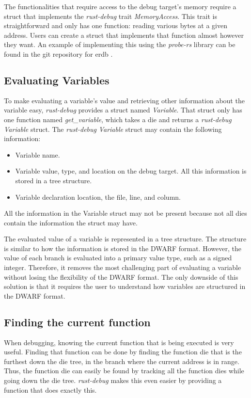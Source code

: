 The functionalities that require access to the debug target's memory require a struct that implements the \emph{rust-debug} trait \emph{MemoryAccess}.
This trait is straightforward and only has one function: reading various bytes at a given address.
Users can create a struct that implements that function almost however they want.
An example of implementing this using the \emph{probe-rs} library can be found in the git repository for \gls{erdb} \cite{erdb}.



\subsection{Evaluating Variables} \label{sec:ievalvar}
To make evaluating a variable's value and retrieving other information about the variable easy, \emph{rust-debug} provides a struct named \emph{Variable}.
That struct only has one function named \emph{get\_variable}, which takes a \gls{die} and returns a \emph{rust-debug} \emph{Variable} struct.
The \emph{rust-debug} \emph{Variable} struct may contain the following information:


\begin{itemize}
  \item Variable name.
  \item Variable value, type, and location on the debug target. All this information is stored in a tree structure.
  \item Variable declaration location, the file, line, and column.
\end{itemize}


All the information in the Variable struct may not be present because not all \glspl{die} contain the information the struct may have.


The evaluated value of a variable is represented in a tree structure.
The structure is similar to how the information is stored in the \gls{DWARF} format.
However, the value of each branch is evaluated into a primary value type, such as a signed integer.
Therefore, it removes the most challenging part of evaluating a variable without losing the flexibility of the \gls{DWARF} format.
The only downside of this solution is that it requires the user to understand how variables are structured in the \gls{DWARF} format.


\subsection{Finding the current function} \label{sec:funcdie} %
When debugging, knowing the current function that is being executed is very useful.
Finding that function can be done by finding the function \gls{die} that is the furthest down the \gls{die} tree, in the branch where the current address is in range.
Thus, the function \gls{die} can easily be found by tracking all the function \glspl{die} while going down the \gls{die} tree.
\emph{rust-debug} makes this even easier by providing a function that does exactly this.


